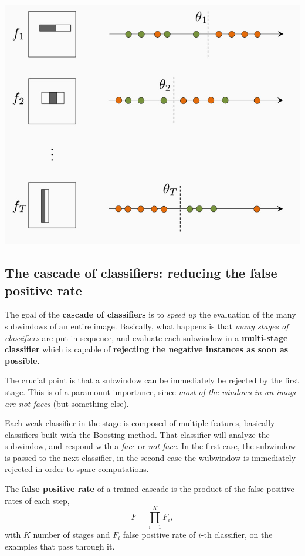 \documentclass[10pt]{report}
\begin{document}
\begin{center}
\includegraphics[width=.9\linewidth]{./pics/recog/boosting-greedy-1.jpg}
\end{center}


\subsection{The cascade of classifiers: reducing the false positive rate}
\label{sec:orgf1821eb}
The goal of the \textbf{cascade of classifiers} is to \emph{speed up} the evaluation of the many subwindows of an entire image. Basically, what happens is that \emph{many stages of classifiers} are put in sequence, and evaluate each subwindow in a \textbf{multi\--stage classifier} which is capable of \textbf{rejecting the negative instances as soon as possible}.

The crucial point is that a subwindow can be immediately be rejected by the first stage. This is of a paramount importance, since \emph{most of the windows in an image are not faces} (but something else).

Each weak classifier in the stage is composed of multiple features, basically classifiers built with the Boosting method. That classifier will analyze the subwindow, and respond with a \emph{face} or \emph{not face}. In the first case, the subwindow is passed to the next classifier, in the second case the wubwindow is immediately rejected in order to spare computations.

The \textbf{false positive rate} of a trained cascade is the product of the false positive rates of each step, $$F = \prod_{i=1}^K F_i,$$ with \(K\) number of stages and \(F_i\) false positive rate of \(i\mbox{-th}\) classifier, on the examples that pass through it.
\end{document}
